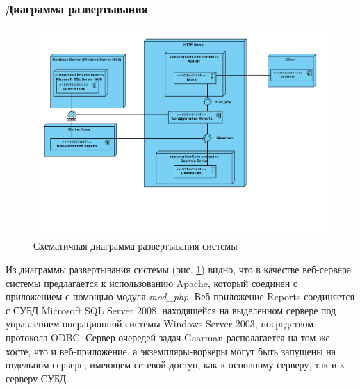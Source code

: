 \subsubsection{Диаграмма развертывания}
\begin{figure}[!ht]
\begin{center}
\vspace{-0.5cm}
\includegraphics[scale=0.6, trim=10mm 50mm 0mm 10mm, clip]{../resources/uml/Deployment.pdf}
\caption{Схематичная диаграмма развертывания системы}
\label{gr:deployment}
\end{center}
\end{figure} 

Из диаграммы развертывания системы (рис. \ref{gr:deployment}) видно, что в качестве веб-сервера
системы предлагается к использованию Apache, который соединен с приложением с помощью модуля \textit{mod\_php}.
Веб-приложение Reports соединяется с СУБД Microsoft SQL Server 2008, находящейся на выделенном
сервере под управлением операционной системы Windows Server 2003, посредством протокола ODBC.
Сервер очередей задач Gearman располагается на том же хосте, что и веб-приложение, а экземпляры-воркеры
могут быть запущены на отдельном сервере, имеющем сетевой доступ, как к основному серверу,
так и к серверу СУБД.
